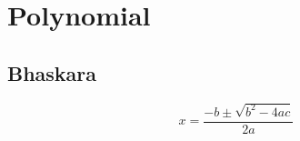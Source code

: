 \section{Polynomial}

\subsection{Bhaskara}
\begin{equation}\label{eq:bhaskara}
x = \frac{{-b \pm \sqrt{{b^2 - 4ac}}}}{{2a}}
\end{equation}

